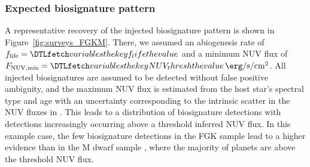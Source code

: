 \documentclass[twocolumn,twocolappendix,linenumbers]{aastex631}
\begin{document}
\subsubsection{Expected biosignature pattern}
A representative recovery of the injected biosignature pattern is shown in Figure~\ref{fig:surveys_FGKM}.
There, we assumed an abiogenesis rate of $f_\mathrm{life} = \var{f_life}$ and a minimum \gls{NUV} flux of $F_\mathrm{NUV, min} = \var{NUV_thresh}\,\SI{}{\erg\per\second\per\centi\meter\squared}$.
All injected biosignatures are assumed to be detected without false positive ambiguity, and the maximum \gls{NUV} flux is estimated from the host star's spectral type and age with an uncertainty corresponding to the intrinsic scatter in the \gls{NUV} fluxes in \citet{Richey-Yowell2023}.
This leads to a distribution of biosignature detections with detections increasingly occurring above a threshold inferred NUV flux.
In this example case, the few biosignature detections in the FGK sample lead to a higher evidence %
than in the M dwarf sample%
, where the majority of planets are above the threshold \gls{NUV} flux.
\end{document}
